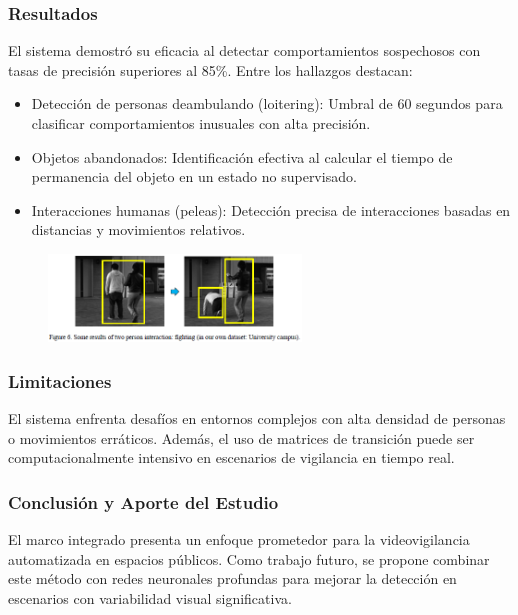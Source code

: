 \documentclass[listof=nochaptergap,12pt,times,authoryear]{report}
\begin{document}
\subsubsection{Resultados}
El sistema demostró su eficacia al detectar comportamientos sospechosos con tasas de precisión superiores al 85\%. Entre los hallazgos destacan:

\begin{itemize}
    \item Detección de personas deambulando (loitering): Umbral de 60 segundos para clasificar comportamientos inusuales con alta precisión.
    \item Objetos abandonados: Identificación efectiva al calcular el tiempo de permanencia del objeto en un estado no supervisado.
    \item Interacciones humanas (peleas): Detección precisa de interacciones basadas en distancias y movimientos relativos.
\end{itemize}

\begin{figure}[h] %
    \centering
    \includegraphics[width=0.6\textwidth]{re8.png} %
    \label{fig:ejemplo} %
\end{figure}

\subsubsection{Limitaciones}
El sistema enfrenta desafíos en entornos complejos con alta densidad de personas o movimientos erráticos. Además, el uso de matrices de transición puede ser computacionalmente intensivo en escenarios de vigilancia en tiempo real.

\subsubsection{Conclusión y Aporte del Estudio}
El marco integrado presenta un enfoque prometedor para la videovigilancia automatizada en espacios públicos. Como trabajo futuro, se propone combinar este método con redes neuronales profundas para mejorar la detección en escenarios con variabilidad visual significativa.
\end{document}
